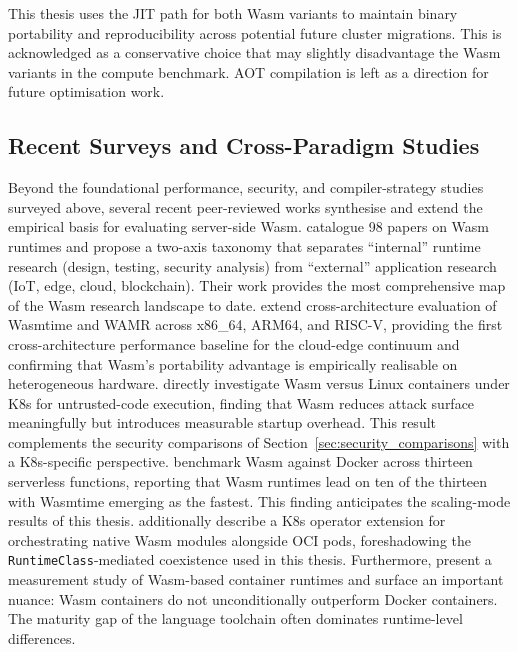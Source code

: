 This thesis uses the \acs{JIT} path for both \acs{Wasm} variants to maintain binary portability and reproducibility across potential future cluster migrations. This is acknowledged as a conservative choice that may slightly disadvantage the \acs{Wasm} variants in the compute benchmark. \acs{AOT} compilation is left as a direction for future optimisation work.

\subsection{Recent Surveys and Cross-Paradigm Studies}
\label{sec:recent_surveys}

\begin{sloppypar}
Beyond the foundational performance, security, and compiler-strategy studies surveyed above, several recent peer-reviewed works synthesise and extend the empirical basis for evaluating server-side \acs{Wasm}. \textcite{zhang2024wasmsurvey} catalogue 98 papers on \acs{Wasm} runtimes and propose a two-axis taxonomy that separates ``internal'' runtime research (design, testing, security analysis) from ``external'' application research (\acs{IoT}, edge, cloud, blockchain). Their work provides the most comprehensive map of the \acs{Wasm} research landscape to date. \textcite{kakati2024crossarch} extend cross-architecture evaluation of Wasmtime and \acs{WAMR} across x86\_64, ARM64, and RISC-V, providing the first cross-architecture performance baseline for the cloud-edge continuum and confirming that \acs{Wasm}'s portability advantage is empirically realisable on heterogeneous hardware. \textcite{wiegratz2024k8swasm} directly investigate \acs{Wasm} versus Linux containers under \acs{K8s} for untrusted-code execution, finding that \acs{Wasm} reduces attack surface meaningfully but introduces measurable startup overhead. This result complements the security comparisons of Section~\ref{sec:security_comparisons} with a \acs{K8s}-specific perspective. \textcite{kjorveziroski2023serverless} benchmark \acs{Wasm} against Docker across thirteen serverless functions, reporting that \acs{Wasm} runtimes lead on ten of the thirteen with Wasmtime emerging as the fastest. This finding anticipates the scaling-mode results of this thesis. \textcite{kjorveziroski2023orchestration} additionally describe a \acs{K8s} operator extension for orchestrating native \acs{Wasm} modules alongside \acs{OCI} pods, foreshadowing the \texttt{RuntimeClass}-mediated coexistence used in this thesis. Furthermore, \textcite{liu2025wasmcontainer} present a measurement study of \acs{Wasm}-based container runtimes and surface an important nuance: \acs{Wasm} containers do not unconditionally outperform Docker containers. The maturity gap of the language toolchain often dominates runtime-level differences.
\end{sloppypar}

